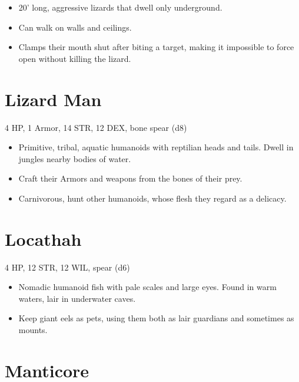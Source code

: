 \documentclass[
  10pt,
  american,
]{article}
\begin{document}
\begin{samepage}
\begin{itemize}
\setlength\itemsep{-.5em}
\item 20' long, aggressive lizards that dwell only underground.
\item Can walk on walls and ceilings.
\item Clamps their mouth shut after biting a target, making it impossible to force open without killing the lizard.
\end{itemize}
\end{samepage}

\hypertarget{lizard-man}{%
\section{Lizard Man}\label{lizard-man}}

4 HP, 1 Armor, 14 STR, 12 DEX, bone spear (d8)

\begin{samepage}
\begin{itemize}
\setlength\itemsep{-.5em}
\item Primitive, tribal, aquatic humanoids with reptilian heads and tails. Dwell in jungles nearby bodies of water.
\item Craft their Armors and weapons from the bones of their prey.
\item Carnivorous, hunt other humanoids, whose flesh they regard as a delicacy.
\end{itemize}
\end{samepage}

\hypertarget{locathah}{%
\section{Locathah}\label{locathah}}

4 HP, 12 STR, 12 WIL, spear (d6)

\begin{samepage}
\begin{itemize}
\setlength\itemsep{-.5em}
\item Nomadic humanoid fish with pale scales and large eyes. Found in warm waters, lair in underwater caves.
\item Keep giant eels as pets, using them both as lair guardians and sometimes as mounts.
\end{itemize}
\end{samepage}

\hypertarget{manticore}{%
\section{Manticore}\label{manticore}}
\end{document}
